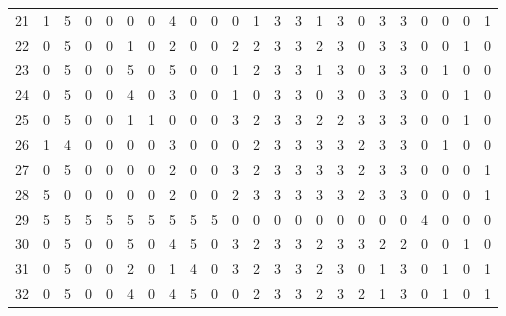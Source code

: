\begin{table}[htbp]
{\begin{tabular}{lllllllllllllllllllllll}
21                  & 1 & 5 & 0 & 0 & 0 & 0 & 4 & 0 & 0 & 0 & 1 & 3 & 3 & 1 & 3 & 0 & 3 & 3 & 0                  & 0                   & 0                   & 1                   \\
22                  & 0 & 5 & 0 & 0 & 1 & 0 & 2 & 0 & 0 & 2 & 2 & 3 & 3 & 2 & 3 & 0 & 3 & 3 & 0                  & 0                   & 1                   & 0                   \\
23                  & 0 & 5 & 0 & 0 & 5 & 0 & 5 & 0 & 0 & 1 & 2 & 3 & 3 & 1 & 3 & 0 & 3 & 3 & 0                  & 1                   & 0                   & 0                   \\
24                  & 0 & 5 & 0 & 0 & 4 & 0 & 3 & 0 & 0 & 1 & 0 & 3 & 3 & 0 & 3 & 0 & 3 & 3 & 0                  & 0                   & 1                   & 0                   \\
25                  & 0 & 5 & 0 & 0 & 1 & 1 & 0 & 0 & 0 & 3 & 2 & 3 & 3 & 2 & 2 & 3 & 3 & 3 & 0                  & 0                   & 1                   & 0                   \\
26                  & 1 & 4 & 0 & 0 & 0 & 0 & 3 & 0 & 0 & 0 & 2 & 3 & 3 & 3 & 3 & 2 & 3 & 3 & 0                  & 1                   & 0                   & 0                   \\
27                  & 0 & 5 & 0 & 0 & 0 & 0 & 2 & 0 & 0 & 3 & 2 & 3 & 3 & 3 & 3 & 2 & 3 & 3 & 0                  & 0                   & 0                   & 1                   \\
28                  & 5 & 0 & 0 & 0 & 0 & 0 & 2 & 0 & 0 & 2 & 3 & 3 & 3 & 3 & 3 & 2 & 3 & 3 & 0                  & 0                   & 0                   & 1                   \\
29                  & 5 & 5 & 5 & 5 & 5 & 5 & 5 & 5 & 5 & 0 & 0 & 0 & 0 & 0 & 0 & 0 & 0 & 0 & 4                  & 0                   & 0                   & 0                   \\
30                  & 0 & 5 & 0 & 0 & 5 & 0 & 4 & 5 & 0 & 3 & 2 & 3 & 3 & 2 & 3 & 3 & 2 & 2 & 0                  & 0                   & 1                   & 0                   \\
31                  & 0 & 5 & 0 & 0 & 2 & 0 & 1 & 4 & 0 & 3 & 2 & 3 & 3 & 2 & 3 & 0 & 1 & 3 & 0                  & 1                   & 0                   & 1                   \\
32                  & 0 & 5 & 0 & 0 & 4 & 0 & 4 & 5 & 0 & 0 & 2 & 3 & 3 & 2 & 3 & 2 & 1 & 3 & 0                  & 1                   & 0                   & 1                   \\

\end{tabular}}
\end{table}
